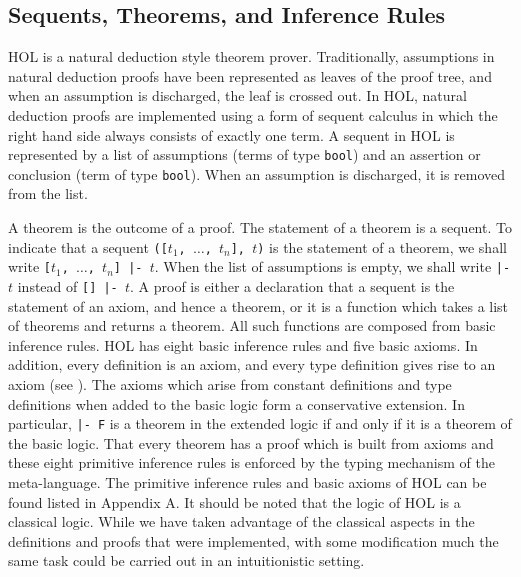 \subsection{Sequents, Theorems, and Inference Rules}

HOL is a natural deduction style theorem prover.  Traditionally,
assumptions in natural deduction proofs have been represented as
leaves of the proof tree, and when an assumption is discharged, the
leaf is crossed out.  In HOL, natural deduction proofs are implemented
using a form of sequent calculus in which the right hand side always
consists of exactly one term.  A sequent in HOL is represented by a
list of assumptions (terms of type {\tt bool}) and an assertion or
conclusion (term of type {\tt bool}).  When an assumption is
discharged, it is removed from the list.

A theorem is the outcome of a proof.  The statement of a theorem is a
sequent.  To indicate that a sequent {\tt ([$t_1$, $\ldots$, $t_n$],
$t$)} is the statement of a theorem, we shall write {\tt [$t_1$,
$\ldots$, $t_n$] |- $t$}.  When the list of assumptions is empty, we
shall write {\tt |- $t$} instead of {\tt [] |- $t$}.  A proof is
either a declaration that a sequent is the statement of an axiom, and
hence a theorem, or it is a function which takes a list of theorems
and returns a theorem.  All such functions are composed from basic
inference rules.  HOL has eight basic inference rules and five basic
axioms.  In addition, every definition is an axiom, and every type
definition gives rise to an axiom (see \cite{Melham88}).  The axioms
which arise from constant definitions and type definitions when added
to the basic logic form a conservative extension.  In particular,
{\tt |- F} is a theorem in the extended logic if and only if it is a
theorem of the basic logic.  That every theorem has a proof which is
built from axioms and these eight primitive inference rules is
enforced by the typing mechanism of the meta-language.  The primitive
inference rules and basic axioms of HOL can be found listed in
Appendix A.  It should be noted that the logic of HOL is a classical
logic.  While we have taken advantage of the classical aspects in the
definitions and proofs that were implemented, with some modification
much the same task could be carried out in an intuitionistic setting.

